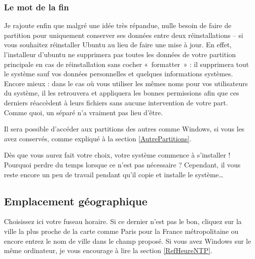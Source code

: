 \subsubsection{Le mot de la fin}
Je rajoute enfin que malgré une idée très répandue, nulle besoin de faire de partition  pour uniquement conserver ses données entre deux réinstallations -- si vous souhaitez réinstaller Ubuntu au lieu de faire une mise à jour. En effet, l'installeur d'ubuntu ne supprimera pas toutes les données de votre partition principale \Chemin{/} en cas de réinstallation sans cocher «~formatter~» : il supprimera tout le système sauf vos données personnelles et quelques informations systèmes. Encore mieux : dans le cas où vous utiliser les mêmes noms pour vos utilisateurs du système, il les retrouvera et appliquera les bonnes permissions afin que ces derniers réaccèdent à leurs fichiers sans aucune intervention de votre part. Comme quoi, un  séparé n'a vraiment pas lieu d'être.
\begin{nota}
Il sera possible d'accéder aux partitions des autres  comme Windows, si vous les avez conservés, comme expliqué à la section \ref{AutrePartitions}.
\end{nota}
Dès que vous aurez fait votre choix, votre système commence à s'installer ! Pourquoi perdre du temps lorsque ce n'est pas nécessaire ? Cependant, il vous reste encore un peu de travail pendant qu'il copie et installe le système\ldots{}
\subsection{Emplacement géographique}
Choisissez ici votre fuseau horaire. Si ce dernier n'est pas le bon, cliquez sur la ville la plus proche de la carte comme Paris pour la France métropolitaine ou encore entrez le nom de ville dans le champ proposé. Si vous avez Windows sur le même ordinateur, je vous encourage à lire la section \ref{RefHeureNTP}.
